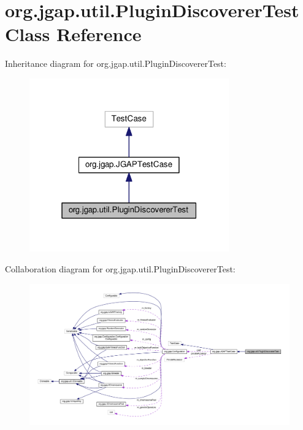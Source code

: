 \hypertarget{classorg_1_1jgap_1_1util_1_1_plugin_discoverer_test}{\section{org.\-jgap.\-util.\-Plugin\-Discoverer\-Test Class Reference}
\label{classorg_1_1jgap_1_1util_1_1_plugin_discoverer_test}
}


Inheritance diagram for org.\-jgap.\-util.\-Plugin\-Discoverer\-Test\-:
\nopagebreak
\begin{figure}[H]
\begin{center}
\leavevmode
\includegraphics[width=244pt]{classorg_1_1jgap_1_1util_1_1_plugin_discoverer_test__inherit__graph}
\end{center}
\end{figure}


Collaboration diagram for org.\-jgap.\-util.\-Plugin\-Discoverer\-Test\-:
\nopagebreak
\begin{figure}[H]
\begin{center}
\leavevmode
\includegraphics[width=350pt]{classorg_1_1jgap_1_1util_1_1_plugin_discoverer_test__coll__graph}
\end{center}
\end{figure}
